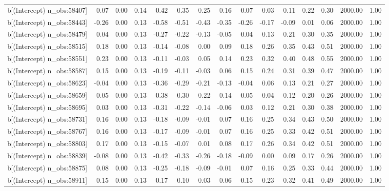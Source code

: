 \begin{table}[ht]
\begin{tabular}{rrrrrrrrrrrrrrr}
  b[(Intercept) n\_obs:58407] & -0.07 & 0.00 & 0.14 & -0.42 & -0.35 & -0.25 & -0.16 & -0.07 & 0.03 & 0.11 & 0.22 & 0.30 & 2000.00 & 1.00 \\ 
  b[(Intercept) n\_obs:58443] & -0.26 & 0.00 & 0.13 & -0.58 & -0.51 & -0.43 & -0.35 & -0.26 & -0.17 & -0.09 & 0.01 & 0.06 & 2000.00 & 1.00 \\ 
  b[(Intercept) n\_obs:58479] & 0.04 & 0.00 & 0.13 & -0.27 & -0.22 & -0.13 & -0.05 & 0.04 & 0.13 & 0.21 & 0.30 & 0.35 & 2000.00 & 1.00 \\ 
  b[(Intercept) n\_obs:58515] & 0.18 & 0.00 & 0.13 & -0.14 & -0.08 & 0.00 & 0.09 & 0.18 & 0.26 & 0.35 & 0.43 & 0.51 & 2000.00 & 1.00 \\ 
  b[(Intercept) n\_obs:58551] & 0.23 & 0.00 & 0.13 & -0.11 & -0.03 & 0.05 & 0.14 & 0.23 & 0.32 & 0.40 & 0.48 & 0.55 & 2000.00 & 1.00 \\ 
  b[(Intercept) n\_obs:58587] & 0.15 & 0.00 & 0.13 & -0.19 & -0.11 & -0.03 & 0.06 & 0.15 & 0.24 & 0.31 & 0.39 & 0.47 & 2000.00 & 1.00 \\ 
  b[(Intercept) n\_obs:58623] & -0.04 & 0.00 & 0.13 & -0.36 & -0.29 & -0.21 & -0.13 & -0.04 & 0.06 & 0.13 & 0.21 & 0.27 & 2000.00 & 1.00 \\ 
  b[(Intercept) n\_obs:58659] & -0.05 & 0.00 & 0.13 & -0.38 & -0.30 & -0.22 & -0.14 & -0.05 & 0.04 & 0.12 & 0.20 & 0.26 & 2000.00 & 1.00 \\ 
  b[(Intercept) n\_obs:58695] & 0.03 & 0.00 & 0.13 & -0.31 & -0.22 & -0.14 & -0.06 & 0.03 & 0.12 & 0.21 & 0.30 & 0.38 & 2000.00 & 1.00 \\ 
  b[(Intercept) n\_obs:58731] & 0.16 & 0.00 & 0.13 & -0.18 & -0.09 & -0.01 & 0.07 & 0.16 & 0.25 & 0.34 & 0.43 & 0.50 & 2000.00 & 1.00 \\ 
  b[(Intercept) n\_obs:58767] & 0.16 & 0.00 & 0.13 & -0.17 & -0.09 & -0.01 & 0.07 & 0.16 & 0.25 & 0.33 & 0.42 & 0.51 & 2000.00 & 1.00 \\ 
  b[(Intercept) n\_obs:58803] & 0.17 & 0.00 & 0.13 & -0.15 & -0.07 & 0.01 & 0.08 & 0.17 & 0.26 & 0.34 & 0.42 & 0.51 & 2000.00 & 1.00 \\ 
  b[(Intercept) n\_obs:58839] & -0.08 & 0.00 & 0.13 & -0.42 & -0.33 & -0.26 & -0.18 & -0.09 & 0.00 & 0.09 & 0.17 & 0.26 & 2000.00 & 1.00 \\ 
  b[(Intercept) n\_obs:58875] & 0.08 & 0.00 & 0.13 & -0.25 & -0.18 & -0.09 & -0.01 & 0.07 & 0.16 & 0.25 & 0.33 & 0.44 & 2000.00 & 1.00 \\ 
  b[(Intercept) n\_obs:58911] & 0.15 & 0.00 & 0.13 & -0.17 & -0.10 & -0.03 & 0.06 & 0.15 & 0.23 & 0.32 & 0.41 & 0.49 & 2000.00 & 1.00 \\ 

\end{tabular}
\end{table}
